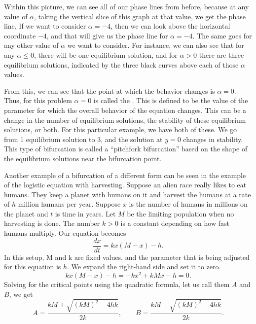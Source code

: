 Within this picture, we can see all of our phase lines from before, because at any value of $\alpha$, taking the vertical slice of this graph at that value, we get the phase line. If we want to consider $\alpha = -4$, then we can look above the horizontal coordinate $-4$, and that will give us the phase line for $\alpha = -4$. The same goes for any other value of $\alpha$ we want to consider. For instance, we can also see that for any $\alpha \leq 0$, there will be one equilibrium solution, and for $\alpha > 0$ there are three equilibrium solutions, indicated by the three black curves above each of those $\alpha$ values.  

From this, we can see that the point at which the behavior changes is $\alpha = 0$. Thus, for this problem $\alpha = 0$ is called the \emph{}. This is defined to be the value of the parameter for which the overall behavior of the equation changes. This can be a change in the number of equilibrium solutions, the stability of these equilibrium solutions, or both. For this particular example, we have both of these. We go from 1 equilibrium solution to 3, and the solution at $y=0$ changes in stability. This type of bifurcation is called a ``pitchfork bifurcation'' based on the shape of the equilibrium solutions near the bifurcation point. 

Another example of a bifurcation of a different form can be seen in the example of the logistic equation
with harvesting.
Suppose an alien race really likes to
eat humans.  They keep a planet with humans on it and harvest the
humans at a rate of $h$ million humans per
year.  Suppose $x$
is the number of humans in millions on the planet and $t$ is time in years.
Let $M$ be the limiting
population when no harvesting is done.  The number $k > 0$ is a
constant depending
on how fast humans multiply.  Our equation becomes
\begin{equation*}
\frac{dx}{dt} = kx(M-x) - h .
\end{equation*}
In this setup, M and k are fixed values, and the parameter that is being adjusted for this equation is $h$. 
We expand the right-hand side and set it to zero.
\begin{equation*}
kx(M-x) - h = -kx^2+kMx - h  = 0.
\end{equation*}
Solving for
the critical points using the quadratic formula,
let us call them $A$ and $B$, we get
\begin{equation*}
A = \frac{kM + \sqrt{{(kM)}^2 - 4hk}}{2k}, \qquad
B = \frac{kM - \sqrt{{(kM)}^2 - 4hk}}{2k} .
\end{equation*}

